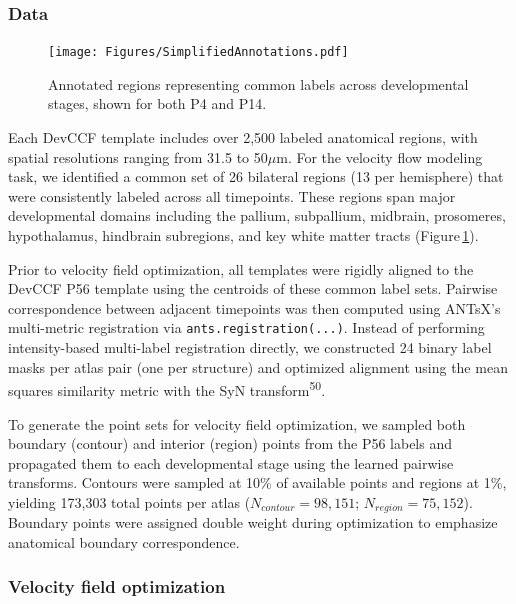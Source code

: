 \documentclass[
  12pt,
]{article}
\begin{document}
\subsubsection{Data}\label{data}

\begin{figure}[!htb]
\centering
\texttt{[image: Figures/SimplifiedAnnotations.pdf]}
\caption{Annotated regions representing common labels across developmental
stages, shown for both P4 and P14.}
\label{fig:simplifiedannotations}
\end{figure}

Each DevCCF template includes over 2,500 labeled anatomical regions,
with spatial resolutions ranging from 31.5 to 50\(\mu\)m. For the
velocity flow modeling task, we identified a common set of 26 bilateral
regions (13 per hemisphere) that were consistently labeled across all
timepoints. These regions span major developmental domains including the
pallium, subpallium, midbrain, prosomeres, hypothalamus, hindbrain
subregions, and key white matter tracts
(Figure\,\ref{fig:simplifiedannotations}).

Prior to velocity field optimization, all templates were rigidly aligned
to the DevCCF P56 template using the centroids of these common label
sets. Pairwise correspondence between adjacent timepoints was then
computed using ANTsX's multi-metric registration via
\texttt{ants.registration(...)}. Instead of performing intensity-based
multi-label registration directly, we constructed 24 binary label masks
per atlas pair (one per structure) and optimized alignment using the
mean squares similarity metric with the SyN
transform\textsuperscript{50}.

To generate the point sets for velocity field optimization, we sampled
both boundary (contour) and interior (region) points from the P56 labels
and propagated them to each developmental stage using the learned
pairwise transforms. Contours were sampled at 10\% of available points
and regions at 1\%, yielding 173,303 total points per atlas
(\(N_{contour} = 98{,}151\); \(N_{region} = 75{,}152\)). Boundary points
were assigned double weight during optimization to emphasize anatomical
boundary correspondence.

\subsubsection{Velocity field
optimization}\label{velocity-field-optimization}
\end{document}
